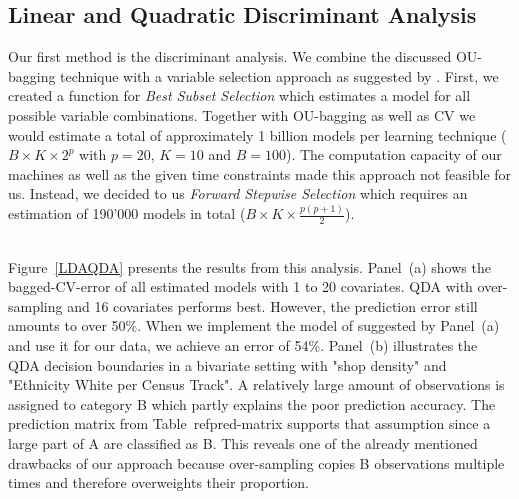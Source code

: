 \documentclass[11pt]{article}
\begin{document}
\subsection{Linear and Quadratic Discriminant Analysis}
Our first method is the discriminant analysis. We combine the discussed OU-bagging technique with a variable selection approach as suggested by \citet[pp. 205 - 10]{James}. First, we created a function for \textit{Best Subset Selection} which estimates a model for all possible variable combinations. Together with OU-bagging as well as CV we would estimate a total of approximately 1 billion models per learning technique ($B \times K \times 2^{p}$ with $p = 20$, $K = 10$ and $B = 100$). The computation capacity of our machines as well as the given time constraints made this approach not feasible for us. Instead, we decided to us \textit{Forward Stepwise Selection} which requires an estimation of 190'000 models in total ($B \times K \times \frac{p(p + 1)}{2}$).\\
\\
\begin{figure}
     \hfill
\end{figure}
Figure~\ref{LDAQDA} presents the results from this analysis. Panel~(a) shows the bagged-CV-error of all estimated models with 1 to 20 covariates. QDA with over-sampling and 16 covariates performs best. However, the prediction error still amounts to over 50\%. When we implement the model of suggested by Panel~(a) and use it for our data, we achieve an error of 54\%. Panel~(b) illustrates the QDA decision boundaries in a bivariate setting with "shop density" and "Ethnicity White per Census Track". A relatively large amount of observations is assigned to category B which partly explains the poor prediction accuracy. The prediction matrix from Table~ref{pred-matrix} supports that assumption since a large part of A are classified as B. This reveals one of the already mentioned drawbacks of our approach because over-sampling copies B observations multiple times and therefore overweights their proportion.\\
\end{document}
